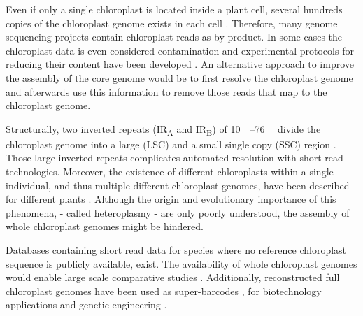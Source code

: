 \documentclass{bmcart}
\newcounter{todocounter}
\newcommand{\ff}[1]
{\stepcounter{todocounter}
 \todo[color=blue!40,author=For Frank]{\thetodocounter: #1}
 }
\newcommand{\ak}[1]
{\stepcounter{todocounter}
 \todo[color=green!40,author=Arthur]{\thetodocounter: #1}
 }
\newcommand{\genename}[1]{\textit{#1}}
\begin{document}
Even if only a single chloroplast is located inside a plant cell, several hundreds copies of the chloroplast genome exists in each cell \cite{kumar_2014,bendich_1987}.
Therefore, many genome sequencing projects contain chloroplast reads as by-product.
In some cases the chloroplast data is even considered contamination and experimental protocols for reducing their content have been developed \cite{lutz_isolation_2011}.
An alternative approach to improve the assembly of the core genome would be to first resolve the chloroplast genome and afterwards use this information to remove those reads that map to the chloroplast genome.

Structurally, two inverted repeats (IR\textsubscript{A} and IR\textsubscript{B}) of \SIrange{10}{76}{\kilo\basepair} divide the chloroplast genome into a large (LSC) and a small single copy (SSC) region \cite{palmer_1985}.
Those large inverted repeats complicates automated resolution with short read technologies\cite{Wang2018}.
Moreover, the existence of different chloroplasts within a single individual, and thus multiple different chloroplast genomes, have been described for different plants \cite{corriveau_1988,Chat2002,Scar2016}.
Although the origin and evolutionary importance of this phenomena, - called heteroplasmy - are only poorly understood, the assembly of whole chloroplast genomes might be hindered.  

Databases containing short read data for species where no reference chloroplast sequence is publicly available, exist.
The availability of whole chloroplast genomes would enable large scale comparative studies \cite{tonti-filippini_what_2017}.
Additionally, reconstructed full chloroplast genomes have been used as super-barcodes \cite{coissac_barcodes_2016}, for biotechnology applications and genetic engineering \cite{daniell_chloroplast_2016}.

%
\end{document}
